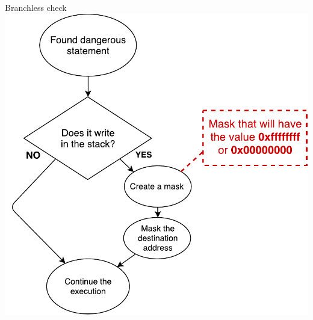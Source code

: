 \documentclass{beamer}
\begin{document}
\begin{frame}[c]{Branchless check}
	\hspace{30mm}
	\includegraphics[height=0.8\textheight]{images/branchless_check.pdf}
\end{frame}
%
%
%
\end{document}

